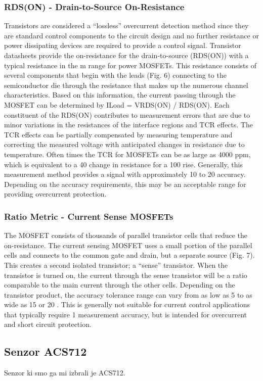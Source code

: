 \documentclass[12pt,a4paper,titlepage,openany]{report}
\begin{document}
\subsubsection{RDS(ON) - Drain-to-Source On-Resistance}
Transistors are considered a “lossless” overcurrent detection method since they are standard control components to the circuit
design and no further resistance or power dissipating devices are required to provide a control signal. Transistor datasheets
provide the on-resistance for the drain-to-source (RDS(ON)) with a typical resistance in the m range for power MOSFETs. This
resistance consists of several components that begin with the leads (Fig. 6) connecting to the semiconductor die through the
resistance that makes up the numerous channel characteristics. Based on this information, the current passing through the
MOSFET can be determined by ILoad = VRDS(ON) / RDS(ON).
Each constituent of the RDS(ON) contributes to measurement errors that are due to minor variations in the resistances of the
interface regions and TCR effects. The TCR effects can be partially compensated by measuring temperature and correcting the
measured voltage with anticipated changes in resistance due to temperature. Often times the TCR for MOSFETs can be as large
as 4000 ppm, which is equivalent to a 40  change in resistance for a 100  rise. Generally, this measurement method
provides a signal with approximately 10  to 20  accuracy. Depending on the accuracy requirements, this may be an
acceptable range for providing overcurrent protection.

\subsubsection{Ratio Metric - Current Sense MOSFETs}
The MOSFET consists of thousands of parallel transistor cells that reduce the on-resistance. The current sensing MOSFET uses
a small portion of the parallel cells and connects to the common gate and drain, but a separate source (Fig. 7). This creates a
second isolated transistor; a “sense” transistor. When the transistor is turned on, the current through the sense transistor will
be a ratio comparable to the main current through the other cells.
Depending on the transistor product, the accuracy tolerance range can vary from as low as 5  to as wide as 15  or 20 .
This is generally not suitable for current control applications that typically require 1  measurement accuracy, but is intended
for overcurrent and short circuit protection.

\subsection{Senzor ACS712}
Senzor ki smo ga mi izbrali je ACS712.
\end{document}
